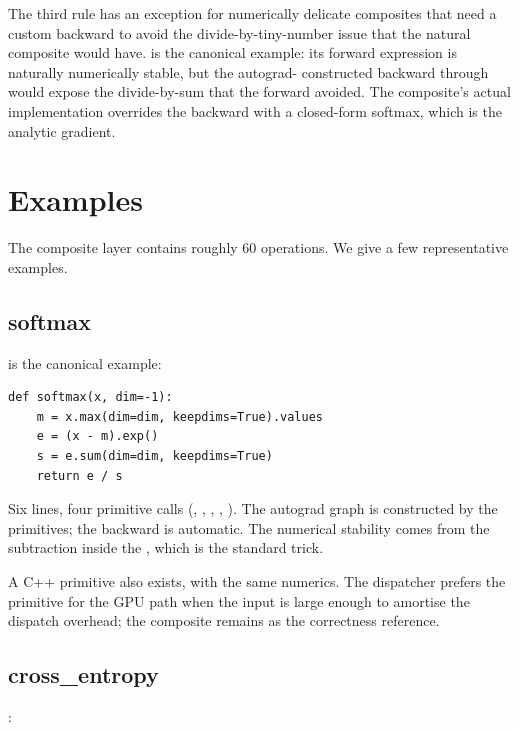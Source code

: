 The third rule has an exception for numerically delicate composites
that need a custom backward to avoid the
divide-by-tiny-number issue that the natural composite would
have.  is the canonical example: its forward
expression is naturally numerically stable, but the autograd-
constructed backward through  would expose the
divide-by-sum that the forward avoided. The composite's actual
implementation overrides the backward with a closed-form softmax,
which is the analytic gradient.

\section{Examples}
\label{sec:composite_ops:examples}

The composite layer contains roughly 60 operations. We give a few
representative examples.

\subsection{softmax}
\label{ssec:composite_ops:softmax}

 is the canonical example:

\begin{lstlisting}[style=lucid,language=LucidPython]
def softmax(x, dim=-1):
    m = x.max(dim=dim, keepdims=True).values
    e = (x - m).exp()
    s = e.sum(dim=dim, keepdims=True)
    return e / s
\end{lstlisting}

Six lines, four primitive calls (, ,
, , ). The autograd graph is
constructed by the primitives; the backward is automatic. The
numerical stability comes from the  subtraction inside
the , which is the standard trick.

A C++ primitive  also exists, with the same
numerics. The dispatcher prefers the primitive for the GPU path
when the input is large enough to amortise the dispatch overhead;
the composite remains as the correctness reference.

\subsection{cross\_entropy}
\label{ssec:composite_ops:cross_entropy}

:

